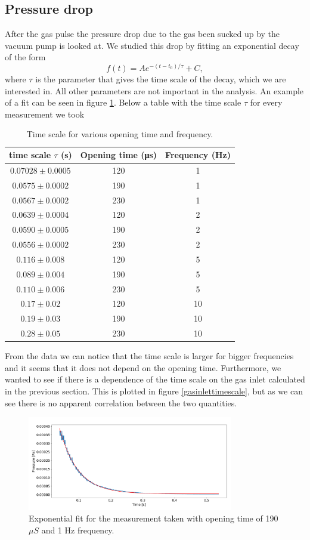 \documentclass[a4paper,10pt]{article}
\begin{document}
\subsection{Pressure drop}
After the gas pulse the pressure drop due to the gas been sucked up by the vacuum pump is looked at. We studied this drop by fitting an exponential decay of the form
\[f(t) = Ae^{-(t - t_0)/\tau} + C,\]
where $\tau$ is the parameter that gives the time scale of the decay, which we are interested in. All other parameters are not important in the analysis. An example of a fit can be seen in figure \ref{expfit}. Below a table with the time scale $\tau$ for every measurement we took
\begin{table}[H]
\centering
\caption{Time scale for various opening time and frequency. }
\begin{tabular}{ccc} \toprule
    time scale $\tau$ (s) & Opening time (\si{\micro \s}) & Frequency (\si{\hertz}) \\ \midrule
$0.07028 \pm 0.0005 $& 120& 1\\
$0.0575 \pm 0.0002$& 190& 1\\

$0.0567 \pm 0.0002$& 230& 1\\\midrule
$0.0639 \pm 0.0004$& 120& 2\\
$0.0590 \pm 0.0005$& 190& 2\\
$0.0556 \pm 0.0002 $& 230& 2\\ \midrule
$0.116 \pm 0.008$& 120& 5\\
$0.089 \pm 0.004$ & 190& 5\\ 
$0.110 \pm  0.006$ & 230& 5\\\midrule
$0.17 \pm  0.02$& 120& 10\\ 
$0.19 \pm 0.03$ & 190& 10\\
$0.28 \pm 0.05 $ & 230& 10\\ \bottomrule
\end{tabular}
\end{table}
From the data we can notice that the time scale is larger for bigger frequencies and it seems that it does not depend on the opening time. Furthermore, we wanted to see if there is a dependence of the time scale on the gas inlet calculated in the previous section. This is plotted in figure \ref{gasinlettimescale}, but as we can see there is no apparent correlation between the two quantities.

\begin{figure}[H]
\centering
\includegraphics[width = 0.8\textwidth]{expfit}
\caption{Exponential fit for the measurement taken with opening time of 190 $\mu S$ and 1 Hz frequency.}\label{expfit}
\end{figure}
\end{document}
